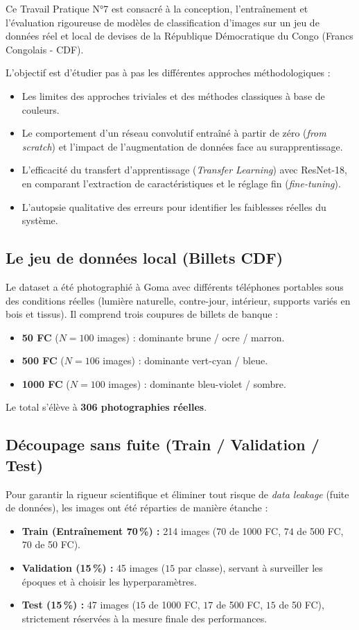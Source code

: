 \documentclass[11pt,a4paper]{article}
\begin{document}
Ce Travail Pratique N°7 est consacré à la conception, l'entraînement et l'évaluation rigoureuse de modèles de classification d'images sur un jeu de données réel et local de devises de la République Démocratique du Congo (Francs Congolais - CDF).

L'objectif est d'étudier pas à pas les différentes approches méthodologiques :
\begin{itemize}
    \item Les limites des approches triviales et des méthodes classiques à base de couleurs.
    \item Le comportement d'un réseau convolutif entraîné à partir de zéro (\textit{from scratch}) et l'impact de l'augmentation de données face au surapprentissage.
    \item L'efficacité du transfert d'apprentissage (\textit{Transfer Learning}) avec ResNet-18, en comparant l'extraction de caractéristiques et le réglage fin (\textit{fine-tuning}).
    \item L'autopsie qualitative des erreurs pour identifier les faiblesses réelles du système.
\end{itemize}

\subsection{Le jeu de données local (Billets CDF)}
Le dataset a été photographié à Goma avec différents téléphones portables sous des conditions réelles (lumière naturelle, contre-jour, intérieur, supports variés en bois et tissus). Il comprend trois coupures de billets de banque :
\begin{itemize}
    \item \textbf{50 FC} ($N=100$ images) : dominante brune / ocre / marron.
    \item \textbf{500 FC} ($N=106$ images) : dominante vert-cyan / bleue.
    \item \textbf{1000 FC} ($N=100$ images) : dominante bleu-violet / sombre.
\end{itemize}
Le total s'élève à \textbf{306 photographies réelles}.

\subsection{Découpage sans fuite (Train / Validation / Test)}
Pour garantir la rigueur scientifique et éliminer tout risque de \textit{data leakage} (fuite de données), les images ont été réparties de manière étanche :
\begin{itemize}
    \item \textbf{Train (Entraînement 70\,\%) :} 214 images ($70$ de 1000 FC, $74$ de 500 FC, $70$ de 50 FC).
    \item \textbf{Validation (15\,\%) :} 45 images ($15$ par classe), servant à surveiller les époques et à choisir les hyperparamètres.
    \item \textbf{Test (15\,\%) :} 47 images ($15$ de 1000 FC, $17$ de 500 FC, $15$ de 50 FC), strictement réservées à la mesure finale des performances.
\end{itemize}
\end{document}
